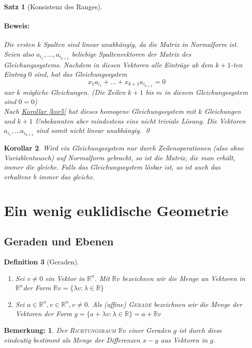 \documentclass{report}
\newcommand{\IN}[1]{\index{#1|BH}}
\newcommand{\lb}{\lambda}
\newcommand{\R}{\mathbb{R}}
\newcommand{\Rn}{\mathbb{R}^n}
\newcommand{\mRn}{\(\mathbb{R}^n\)}
\theoremstyle{customrem}
\newtheorem*{bemerkung}{Bemerkung\textnormal:}
\theoremstyle{customdef}
\newtheorem{definition}{Definition}[chapter]
\newtheorem{korrolar}[definition]{Korollar}
\newtheorem{satz}[definition]{Satz}
\renewenvironment{proof}{\paragraph{Beweis: }}{\qed}
\theoremstyle{customenv}
\newcommand{\defemph}[1]{\textsc{#1}}
\begin{document}
\begin{satz}[Konsistenz des Ranges]
\begin{proof}
			Die ersten \(k\) Spalten sind linear unabhängig, da die Matrix in Normalform ist. Seien also \(a_{i_1}, \dots, a_{i_{k+1}}\) beliebige Spaltenvektoren der Matrix des Gleichungssystems. Nachdem in diesen Vektoren alle Einträge ab dem \(k+1\)-ten Eintrag \(0\) sind, hat das Gleichungssystem 
			\[
			x_1a_{i_1} + \dots + x_{k+1}a_{i_{k+1}} = 0
			\]
			nur \(k\) mögliche Gleichungen. (Die Zeilen \(k+1\) bis \(m\) in diesem Gleichungssystem sind \(0=0\))\\
			Nach \hyperref[kor5]{Korollar \ref*{kor5}} hat dieses homogene Gleichungssystem mit \(k\) Gleichungen und \(k+1\) Unbekannten aber mindestens eine nicht triviale Lösung. Die Vektoren \(a_{i_1}, \dots a_{i_{k+1}}\) sind somit nicht linear unabhängig.
		\end{proof}
	\end{satz}
	\vspace{.2cm}
	\begin{korrolar}
		Wird ein Gleichungssystem \textit{nur} durch Zeilenoperationen (also ohne Variablentausch) auf Normalform gebracht, so ist die Matrix, die man erhält, immer die gleiche. Falls das Gleichungssystem lösbar ist, so ist auch das erhaltene \(b\) immer das gleiche.
	\end{korrolar}
	
	\section{Ein wenig euklidische Geometrie}
	
	\subsection{Geraden und Ebenen}
	
	\begin{definition}[Geraden]
		\IN{Gerade}
		\( \)\vspace{-.5cm}
		\begin{enumerate}
			\item Sei \(v \not= 0\) ein Vektor in \mRn. Mit \(\R v\) bezeichnen wir die Menge an Vektoren in \mRn der Form \(\R v = \{\lb v : \lb \in \R\}\)
			\item Sei \(a \in \Rn, v \in \Rn, v \neq 0\). Als (affine) \defemph{Gerade} bezeichnen wir die Menge der Vektoren der Form \(g = \{a + \lb v : \lb \in \R\} = a + \R v\)
		\end{enumerate}
	\end{definition}
	
	\begin{bemerkung}
		Der \defemph{Richtungsraum} \(\R v\) einer Geraden \(g\) ist durch diese eindeutig bestimmt als Menge der Differenzen \(x - y\) aus Vektoren in \(g\).
	\end{bemerkung}
	
\end{document}
